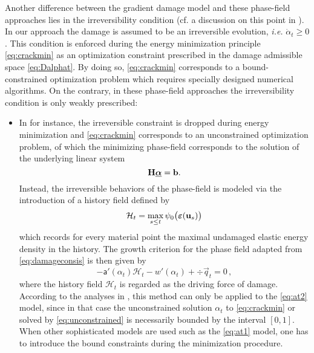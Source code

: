 Another difference between the gradient damage model and these phase-field approaches lies in the irreversibility condition (cf. a discussion on this point in \cite{AmorMarigoMaurini:2009}). In our approach the damage is assumed to be an irreversible evolution, \emph{i.e.} $\dot{\alpha}_t\geq 0$. This condition is enforced during the energy minimization principle \eqref{eq:crackmin} as an optimization constraint prescribed in the damage admissible space \eqref{eq:Dalphat}. By doing so, \eqref{eq:crackmin} corresponds to a bound-constrained optimization problem which requires specially designed numerical algorithms. On the contrary, in these phase-field approaches the irreversibility condition is only weakly prescribed:
\begin{itemize}
\item In \cite{MieheHofackerWelschinger:2010,MieheWelschingerHofacker:2010,BordenVerhooselScottHughesLandis:2012,KlinsmannRosatoKamlahMcMeeking:2015,MayVignolletBorst:2015} for instance, the irreversible constraint is dropped during energy minimization and \eqref{eq:crackmin} corresponds to an unconstrained optimization problem, of which the minimizing phase-field corresponds to the solution of the underlying linear system
\begin{equation} \label{eq:linearsystem}
\vec{H}\dvec=\vec{b}.
\end{equation}
Instead, the irreversible behaviors of the phase-field is modeled via the introduction of a history field defined by
\begin{equation} \label{eq:historyfield}
\mathcal{H}_t=\max_{s\leq t}\psi_0\bigl(\eps(\vec{u}_s)\bigr)
\end{equation}
which records for every material point the maximal undamaged elastic energy density in the history. The growth criterion for the phase field adapted from \eqref{eq:damageconsis} is then given by
\begin{equation} \label{eq:unconstrained}
-\mathsf{a}'(\alpha_t)\mathcal{H}_t-w'(\alpha_t)+\div\vec{q}_t=0\,,
\end{equation}
where the history field $\mathcal{H}_t$ is regarded as the driving force of damage. According to the analyses in \cite{Amor:2008}, this method can only be applied to the \eqref{eq:at2} model, since in that case the unconstrained solution $\alpha_t$ to \eqref{eq:crackmin} or solved by \eqref{eq:unconstrained} is necessarily bounded by the interval $[0,1]$. When other sophisticated models are used such as the \eqref{eq:at1} model, one has to introduce the bound constraints during the minimization procedure.


\end{itemize}
